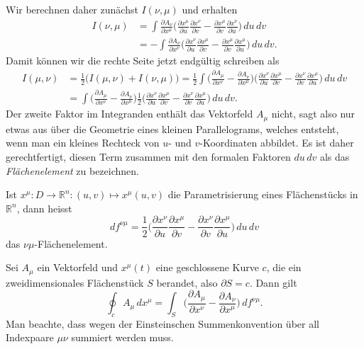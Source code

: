 Wir berechnen daher zunächst $I(\nu,\mu)$ und erhalten
\begin{align*}
I(\nu,\mu)
&=
\int
\frac{\partial A_\nu}{\partial x^\mu}
\biggl(\frac{\partial x^\mu}{\partial u}\frac{\partial x^\nu}{\partial v}
-
\frac{\partial x^\mu}{\partial v}\frac{\partial x^\nu}{\partial u}
\biggr)
\,du\,dv
\\
&=
-
\int
\frac{\partial A_\nu}{\partial x^\nu}
\biggl(\frac{\partial x^\nu}{\partial u}\frac{\partial x^\mu}{\partial v}
-
\frac{\partial x^\mu}{\partial v}\frac{\partial x^\mu}{\partial u}
\biggr)
\,du\,dv.
\end{align*}
Damit können wir die rechte Seite jetzt endgültig schreiben als
\begin{align*}
I(\mu,\nu)
&=
\frac12\biggl( I(\mu,\nu)+I(\nu,\mu)\biggr)
=
\frac12
\int
\biggl(
\frac{\partial A_\mu}{\partial x^\nu}
-
\frac{\partial A_\nu}{\partial x^\mu}
\biggr)
\biggl(
\frac{\partial x^\nu}{\partial u}\frac{\partial x^\mu}{\partial v}
-
\frac{\partial x^\nu}{\partial v}\frac{\partial x^\mu}{\partial u}
\biggr)
\,du\,dv
\\
&=
\int
\biggl(
\frac{\partial A_\mu}{\partial x^\nu}
-
\frac{\partial A_\nu}{\partial x^\mu}
\biggr)
\frac12
\biggl(
\frac{\partial x^\nu}{\partial u}\frac{\partial x^\mu}{\partial v}
-
\frac{\partial x^\nu}{\partial v}\frac{\partial x^\mu}{\partial u}
\biggr)
\,du\,dv.
\end{align*}
Der zweite Faktor im Integranden enthält das Vektorfeld $A_\mu$ nicht,
sagt also nur etwas aus über die Geometrie eines kleinen Parallelograms,
welches entsteht, wenn man ein kleines Rechteck von $u$- und $v$-Koordinaten
abbildet.
Es ist daher gerechtfertigt, diesen Term zusammen mit den formalen
Faktoren $du\,dv$ als das {\em Flächenelement} zu bezeichnen.
\begin{definition}
Ist $x^\mu\colon D\to\mathbb R^n:(u,v)\mapsto x^\mu(u,v)$ die Parametrisierung
eines Flächenstücks in $\mathbb R^n$, dann heisst 
\[
df^{\nu\mu}
=
\frac12
\biggl(
\frac{\partial x^\nu}{\partial u}\frac{\partial x^\mu}{\partial v}
-
\frac{\partial x^\nu}{\partial v}\frac{\partial x^\mu}{\partial u}
\biggr)
\,du\,dv
\]
das $\nu\mu$-Flächenelement.
\end{definition}

\begin{satz}[Stokes]
Sei $A_\mu$ ein Vektorfeld und $x^\mu(t)$ eine geschlossene Kurve $c$,
die ein zweidimensionales Flächenstück $S$ berandet, also $\partial S=c$.
Dann gilt
\[
\oint_c A_\mu\,dx^\mu
=
\int_S \biggl(
\frac{\partial A_\mu}{\partial x^\nu}-\frac{\partial A_\nu}{\partial x^\mu}
\biggr) \,df^{\nu\mu}.
\]
Man beachte, dass wegen der Einsteinschen Summenkonvention über all
Indexpaare $\mu\nu$ summiert werden muss.
\end{satz}

